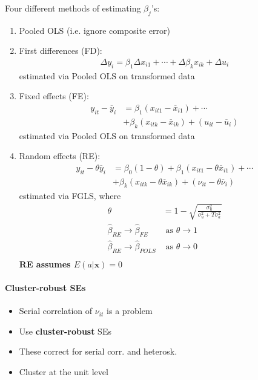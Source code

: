 \documentclass[10pt,landscape]{article}
\begin{document}
\begin{multicols}{3}
\medskip{}

Four different methods of estimating $\beta_j$'s:
\begin{enumerate}
    \item Pooled OLS (i.e. ignore composite error)
    \item First differences (FD):
\begin{align*}
    \Delta y_{i} = \beta_1 \Delta x_{i1} + \cdots + \Delta \beta_k x_{ik} + \Delta u_{i}
\end{align*}
estimated via Pooled OLS on transformed data
    \item Fixed effects (FE):
\begin{align*}
    y_{it}-\overline{y}_{i} &= \beta_1 \left(x_{it1}-\overline{x}_{i1}\right) + \cdots \\
    &+\beta_k \left( x_{itk}-\overline{x}_{ik}\right) + \left(u_{it}-\overline{u}_{i}\right)
\end{align*}
estimated via Pooled OLS on transformed data
    \item Random effects (RE):
\begin{align*}
    y_{it}-\theta\overline{y}_{i} &= \beta_0 \left(1-\theta\right) + \beta_1 \left(x_{it1}-\theta\overline{x}_{i1}\right) + \cdots \\
    &+\beta_k \left( x_{itk}-\theta\overline{x}_{ik}\right) + \left(\nu_{it}-\theta\overline{\nu}_{i}\right)
\end{align*}
estimated via FGLS, where
\begin{align*}
    \theta &= 1-\sqrt{\frac{\sigma^2_u}{\sigma^2_u + T\sigma^2_a}} \\
    \hat{\beta}_{RE} \rightarrow \hat{\beta}_{FE} & \text{ as } \theta \rightarrow 1 \\
    \hat{\beta}_{RE} \rightarrow \hat{\beta}_{POLS} & \text{ as } \theta \rightarrow 0 \\
\end{align*}
\textbf{RE assumes $E\left(a\vert\mathbf{x}\right)= 0$}
\end{enumerate}

\paragraph{Cluster-robust SEs}
\begin{itemize}
    \item Serial correlation of $\nu_{it}$ is a problem
    \item Use \textbf{cluster-robust} SEs
    \item These correct for serial corr. and heterosk.
    \item Cluster at the unit level
\end{itemize}



\end{multicols}
\end{document}
